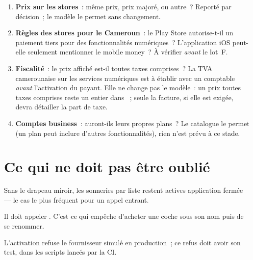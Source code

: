 \begin{enumerate}[leftmargin=1.6em]
  \item \textbf{Prix sur les stores}~: même prix, prix majoré, ou autre~? Reporté par
        décision~; le modèle le permet sans changement.
  \item \textbf{Règles des stores pour le Cameroun}~: le Play Store autorise-t-il un
        paiement tiers pour des fonctionnalités numériques~? L'application iOS peut-elle
        seulement mentionner le mobile money~? À vérifier \emph{avant} le lot~F.
  \item \textbf{Fiscalité}~: le prix affiché est-il toutes taxes comprises~? La TVA
        camerounaise sur les services numériques est à établir avec un comptable
        \emph{avant} l'activation du payant. Elle ne change pas le modèle~: un prix toutes
        taxes comprises reste un entier dans ~; seule la facture, si
        elle est exigée, devra détailler la part de taxe.
  \item \textbf{Comptes business}~: auront-ils leurs propres plans~? Le catalogue le permet
        (un plan peut inclure d'autres fonctionnalités), rien n'est prévu à ce stade.
\end{enumerate}

\section{Ce qui ne doit pas être oublié}

\begin{alerte}
Sans le drapeau miroir, les sonneries par liste restent actives application fermée --- le
cas le plus fréquent pour un appel entrant.
\end{alerte}

\begin{alerte}
Il doit appeler . C'est ce qui empêche d'acheter une coche sous
son nom puis de se renommer.
\end{alerte}

\begin{alerte}
L'activation refuse le fournisseur simulé en production~; ce refus doit avoir son test, dans
les scripts lancés par la CI.
\end{alerte}
